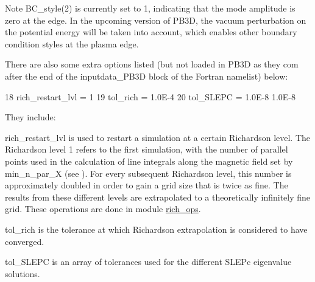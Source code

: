 \begin{DoxyNote}{Note}
{\ttfamily B\+C\+\_\+style(2)} is currently set to 1, indicating that the mode amplitude is zero at the edge. In the upcoming version of P\+B3D, the vacuum perturbation on the potential energy will be taken into account, which enables other boundary condition styles at the plasma edge.
\end{DoxyNote}
There are also some extra options listed (but not loaded in P\+B3D as they com after the end of the {\ttfamily inputdata\+\_\+\+P\+B3D} block of the Fortran namelist) below\+: 
\begin{DoxyCodeInclude}
18     rich\_restart\_lvl        = 1
19     tol\_rich                = 1.0E-4
20     tol\_SLEPC               = 1.0E-8 1.0E-8
\end{DoxyCodeInclude}
They include\+:
\begin{DoxyItemize}
\item {\ttfamily rich\+\_\+restart\+\_\+lvl} is used to restart a simulation at a certain Richardson level. The Richardson level 1 refers to the first simulation, with the number of parallel points used in the calculation of line integrals along the magnetic field set by {\ttfamily min\+\_\+n\+\_\+par\+\_\+X} (see ). For every subsequent Richardson level, this number is approximately doubled in order to gain a grid size that is twice as fine. The results from these different levels are extrapolated to a theoretically infinitely fine grid. These operations are done in module \hyperlink{namespacerich__ops}{rich\+\_\+ops}.
\item {\ttfamily tol\+\_\+rich} is the tolerance at which Richardson extrapolation is considered to have converged.
\item {\ttfamily tol\+\_\+\+S\+L\+E\+PC} is an array of tolerances used for the different S\+L\+E\+Pc eigenvalue solutions.
\end{DoxyItemize}

